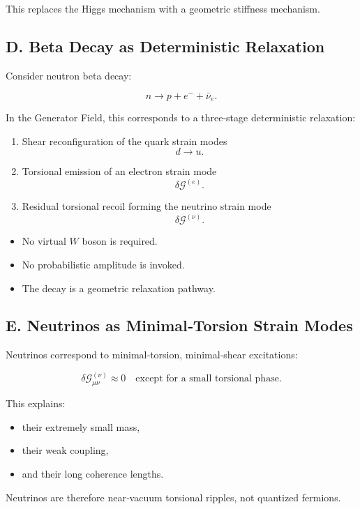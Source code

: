 \documentclass[reprint,amsmath,amssymb,aps,prl,floatfix]{revtex4-2}
\begin{document}
This replaces the Higgs mechanism with a geometric stiffness mechanism.

\subsection{D. Beta Decay as Deterministic Relaxation}

Consider neutron beta decay:

\[
n \rightarrow p + e^- + \bar{\nu}_e.
\]

In the Generator Field, this corresponds to a three‑stage deterministic relaxation:
\begin{enumerate}
\item Shear reconfiguration of the quark strain modes  
   \[
   d \rightarrow u.
   \]

\item Torsional emission of an electron strain mode  
   \[
   \delta\mathcal{G}^{(e)}.
   \]

\item Residual torsional recoil forming the neutrino strain mode  
   \[
   \delta\mathcal{G}^{(\nu)}.
   \]
\end{enumerate}
\medskip
\begin{itemize}
\item No virtual \(W\) boson is required.  
\item No probabilistic amplitude is invoked.  
\item The decay is a geometric relaxation pathway.
\end{itemize}

\subsection{E. Neutrinos as Minimal‑Torsion Strain Modes}

Neutrinos correspond to minimal‑torsion, minimal‑shear excitations:

\[
\delta\mathcal{G}_{\mu\nu}^{(\nu)} \approx 0
\quad\text{except for a small torsional phase}.
\]
\medskip

This explains:
\begin{itemize}
\item their extremely small mass,  
\item their weak coupling,  
\item and their long coherence lengths.
\end{itemize}
\medskip

Neutrinos are therefore near‑vacuum torsional ripples, not quantized fermions.
\medskip
\end{document}
